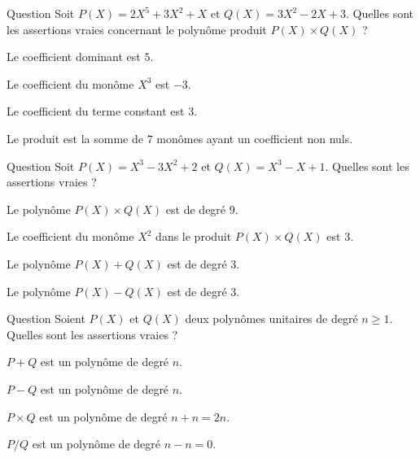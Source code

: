 

\begin{multi}[multiple,feedback=
{\(P(X)\times Q(X) = 6 X^7 - 4 X^6 + 6 X^5 + 9 X^4 - 3 X^3 + 7 X^2 + 3 X\).
}]{Question}
Soit \(P(X) = 2X^5+3X^2+X\) et \(Q(X) = 3X^2-2X+3\).
Quelles sont les assertions vraies concernant le polynôme produit \(P(X)\times Q(X)\) ?

    \item Le coefficient dominant est \(5\).
    \item* Le coefficient du monôme \(X^3\) est \(-3\).
    \item Le coefficient du terme constant est \(3\).
    \item* Le produit est la somme de \(7\) monômes ayant un coefficient non nuls.
\end{multi}


\begin{multi}[multiple,feedback=
{\(P(X)\times Q(X) = X^6 - 3 X^5 - X^4 + 6 X^3 - 3 X^2 - 2 X + 2\), 
\(P(X) + Q(X) = 2 X^3 - 3 X^2 - X + 3\),
\(P(X) - Q(X) = -3 X^2 + X + 1\).
}]{Question}
Soit \(P(X) = X^3-3X^2+2\) et \(Q(X) = X^3-X+1\).
Quelles sont les assertions vraies ?

    \item Le polynôme \(P(X) \times Q(X)\) est de degré \(9\).
    \item Le coefficient du monôme \(X^2\) dans le produit \(P(X) \times Q(X)\) est \(3\).
    \item* Le polynôme \(P(X) + Q(X)\) est de degré \(3\).
    \item Le polynôme \(P(X) - Q(X)\) est de degré \(3\).
\end{multi}


\begin{multi}[multiple,feedback=
{Le quotient de deux polynômes n'est pas un polynôme.
}]{Question}
Soient \(P(X)\) et \(Q(X)\) deux polynômes unitaires de degré \(n\ge1\).
Quelles sont les assertions vraies ?

    \item* \(P+Q\) est un polynôme de degré \(n\).
    \item \(P-Q\) est un polynôme de degré \(n\).
    \item* \(P \times Q\) est un polynôme de degré \(n+n=2n\).
    \item \(P/Q\) est un polynôme de degré \(n-n=0\).
\end{multi}


